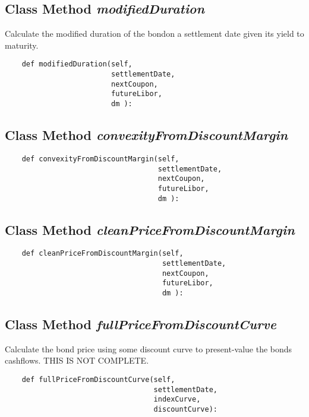 \documentclass[twoside,11pt]{book}
\begin{document}
\subsection{Class Method {\it modifiedDuration}}
Calculate the modified duration of the bondon a settlement date given its yield to maturity. 

\begin{lstlisting}
    def modifiedDuration(self,
                         settlementDate,
                         nextCoupon,
                         futureLibor,
                         dm ):
\end{lstlisting}

\subsection{Class Method {\it convexityFromDiscountMargin}}


\begin{lstlisting}
    def convexityFromDiscountMargin(self, 
                                    settlementDate,
                                    nextCoupon,
                                    futureLibor,
                                    dm ):
\end{lstlisting}

\subsection{Class Method {\it cleanPriceFromDiscountMargin}}


\begin{lstlisting}
    def cleanPriceFromDiscountMargin(self, 
                                     settlementDate,
                                     nextCoupon,
                                     futureLibor,
                                     dm ):
\end{lstlisting}

\subsection{Class Method {\it fullPriceFromDiscountCurve}}
Calculate the bond price using some discount curve to present-value the bonds cashflows. THIS IS NOT COMPLETE. 

\begin{lstlisting}
    def fullPriceFromDiscountCurve(self, 
                                   settlementDate,
                                   indexCurve,
                                   discountCurve):
\end{lstlisting}
\end{document}
